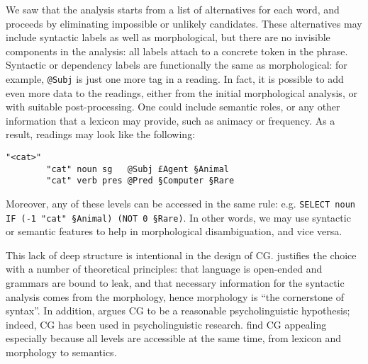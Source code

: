 We saw that the analysis starts from a list of alternatives for each word, and proceeds by eliminating impossible or unlikely candidates.
These alternatives may include syntactic labels as well as morphological, but there are no invisible components in the analysis: all labels attach to a concrete token in the phrase.
Syntactic or dependency labels are functionally the same as morphological: for example, \texttt{@Subj} is just one more tag in a reading.
In fact, it is possible to add even more data to the readings, either from the initial morphological analysis, or with suitable post-processing. One could include semantic roles, or any other information that a lexicon may provide, such as animacy or frequency.
As a result, readings may look like the following:

\begin{verbatim}
"<cat>"
        "cat" noun sg   @Subj £Agent §Animal
        "cat" verb pres @Pred §Computer §Rare
\end{verbatim}

\noindent Moreover, any of these levels can be accessed in the same rule: e.g. \texttt{SELECT noun IF (-1 "cat" §Animal) (NOT 0 §Rare)}. 
In other words, we may use syntactic or semantic features to help in morphological disambiguation, and vice versa.

This lack of deep structure is intentional in the design of CG.
\cite{karlsson1995constraint} justifies the choice with a number of
theoretical principles: that language is open-ended and grammars are
bound to leak, and that necessary information for the syntactic analysis
comes from the morphology, hence morphology is ``the cornerstone of
syntax''. 
In addition, \cite{karlsson1995constraint} argues CG to be a reasonable 
psycholinguistic hypothesis; indeed, CG has been used in psycholinguistic research.
 find CG appealing especially because all levels are accessible at the same time, from lexicon and morphology to semantics.






